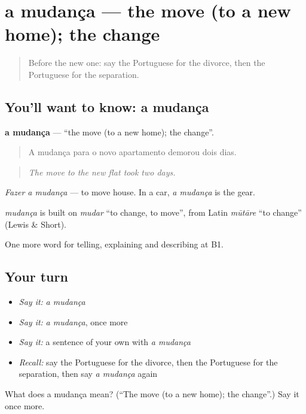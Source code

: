\section[a mudança]{a mudança — the move (to a new home); the change}

\label{lesson:PT-C313-mudanca}



\begin{quote}
Before the new one: say the Portuguese for the divorce, then the Portuguese for the separation.
\end{quote}

\subsection*{You'll want to know: a mudança}
\textbf{a mudança} — \textquotedblleft{}the move (to a new home); the change\textquotedblright{}.

\begin{quote}
A mudança para o novo apartamento demorou dois dias.
\end{quote}

\begin{quote}
\emph{The move to the new flat took two days.}
\end{quote}

\emph{Fazer a mudança} — to move house. In a car, \emph{a mudança} is the gear.

\begin{cousinweb}
\emph{mudança} is built on \emph{mudar} \textquotedblleft{}to change, to move\textquotedblright{}, from Latin \emph{mūtāre} \textquotedblleft{}to change\textquotedblright{} (Lewis \& Short).
\end{cousinweb}

\begin{grammarlens}[title={What you've built}]
One more word for telling, explaining and describing at B1.
\end{grammarlens}

\subsection*{Your turn}
\begin{itemize}
\raggedright
  \item \emph{Say it:} \emph{a mudança}
  \item \emph{Say it:} \emph{a mudança}, once more
  \item \emph{Say it:} a sentence of your own with \emph{a mudança}
  \item \emph{Recall:} say the Portuguese for the divorce, then the Portuguese for the separation, then say \emph{a mudança} again
\end{itemize}

\begin{tcolorbox}[breakable,colback=teal!4,colframe=teal!35!black,title={Before you move on}]
What does a mudança mean? (\textquotedblleft{}The move (to a new home); the change\textquotedblright{}.) Say it once more.
\end{tcolorbox}
